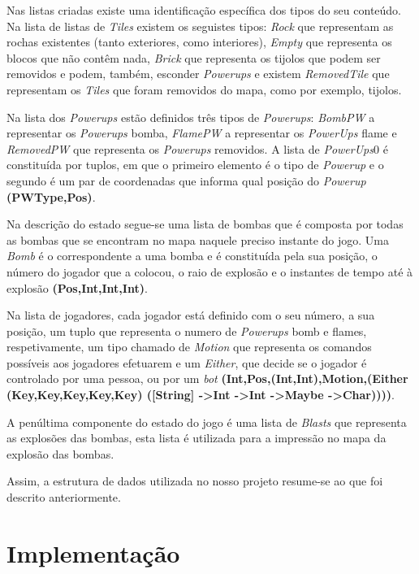 \documentclass[a4paper]{report}
\begin{document}
Nas listas criadas existe uma identificação específica dos tipos do seu conteúdo. Na lista de listas de \textit{Tiles} existem os seguistes tipos: \textit{Rock} que representam as rochas existentes (tanto exteriores, como interiores), \textit{Empty} que representa os blocos que não contêm nada, \textit{Brick} que representa os tijolos que podem ser removidos e podem, também, esconder \textit{Powerups} e existem \textit{RemovedTile} que representam os \textit{Tiles} que foram removidos do mapa, como por exemplo, tijolos. 

Na lista dos \textit{Powerups} estão definidos três tipos de \textit{Powerups}: \textit{BombPW} a representar os \textit{Powerups} bomba, \textit{FlamePW} a representar os \textit{PowerUps} flame e \textit{RemovedPW} que representa os \textit{Powerups} removidos. A lista de \textit{PowerUps}0 é constituída por tuplos, em que o primeiro elemento é o tipo de \textit{Powerup} e o segundo é um par de coordenadas que informa qual posição do \textit{Powerup} \textbf{(PWType,Pos)}.

Na descrição do estado segue-se uma lista de bombas que é composta por todas as bombas que se encontram no mapa naquele preciso instante do jogo. Uma \textit{Bomb} é o correspondente a uma bomba e é constituída pela sua posição, o número do jogador que a colocou, o raio de explosão e o instantes de tempo até à explosão \textbf{(Pos,Int,Int,Int)}.

Na lista de jogadores, cada jogador está definido com o seu número, a sua posição, um tuplo que representa o numero de \textit{Powerups} bomb e flames, respetivamente, um tipo chamado de \textit{Motion} que representa os comandos possíveis aos jogadores efetuarem e um \textit{Either}, que decide se o jogador é controlado por uma pessoa, ou por um \textit{bot} \textbf{(Int,Pos,(Int,Int),Motion,(Either (Key,Key,Key,Key,Key) ([String] -\textgreater Int -\textgreater Int -\textgreater Maybe -\textgreater Char))))}.

A penúltima componente do estado do jogo é uma lista de \textit{Blasts} que representa as explosões das bombas, esta lista é utilizada para a impressão no mapa da explosão das bombas.

Assim, a estrutura de dados utilizada no nosso projeto resume-se ao que foi descrito anteriormente.
\section{Implementação}
\end{document}
